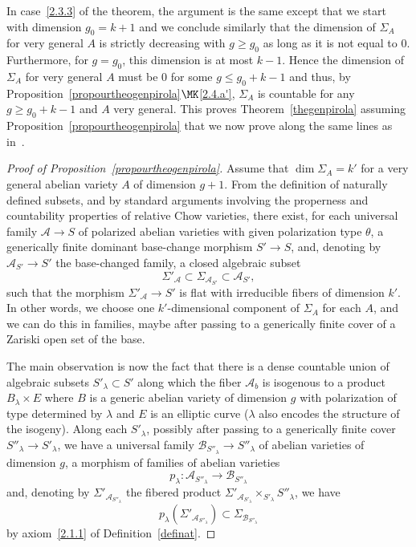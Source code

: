 In case~\eqref{2.3.3} of the theorem, the argument is the same except that we start with dimension $g_0=k+1$ and we conclude similarly that the dimension of $\Sigma_A$ for very general $A$ is strictly decreasing with $g\geq g_0$ as long as it is not equal to $0$. Furthermore, for $g=g_0$, this dimension is at most $k-1$. Hence the dimension of $\Sigma_A$ for very general $A$ must be $0$ for some $g\leq g_0+k-1$ and thus, by Proposition~\ref{propourtheogenpirola}$\MK$\eqref{2.4.a'}, $\Sigma_A$ is countable for any $g\geq g_0+k-1$ and $A$ very general. This proves Theorem~\ref{thegenpirola} assuming Proposition~\ref{propourtheogenpirola} that we now prove along the same lines as in~\cite{pirola}.

\begin{proof}[Proof of Proposition~\ref{propourtheogenpirola}]
Assume that $\dim \Sigma_A= k'$ for a very general abelian variety $A$ of dimension $g+1$. From the definition of naturally defined subsets, and by standard arguments involving the properness and countability properties of relative Chow varieties, there exist, for each universal family $\mathcal{A}\rightarrow S$ of polarized abelian varieties with given polarization type $\theta$, a generically finite dominant base-change morphism $S'\rightarrow S$, and, denoting by $\mathcal{A}_{S'}\rightarrow S'$ the base-changed family, a closed algebraic subset
\[
\Sigma'_{\mathcal{A}}\subset \Sigma_{\mathcal{A}_{S'}}\subset\mathcal{A}_{S'},
\]
such that the morphism $\Sigma'_{\mathcal{A}}\rightarrow S'$ is flat with irreducible fibers of dimension $k'$. In other words, we choose one $k'$-dimensional component of $\Sigma_A$ for each $A$, and we can do this in families, maybe after passing to a generically finite cover of a Zariski open set of the base.

The main observation is now the fact that there is a dense countable union of algebraic subsets $S'_\lambda\subset S'$ along which the fiber $\mathcal{A}_b$ is isogenous to a product $B_\lambda\times E$ where $B$ is a generic abelian variety of dimension $g$ with polarization of type determined by $\lambda$ and $E$ is an elliptic curve ($\lambda$ also encodes the structure of the isogeny). Along each $S'_\lambda$, possibly after passing to a generically finite cover $S''_\lambda\rightarrow S'_\lambda$, we have a universal family $\mathcal{B}_{S''_\lambda}\rightarrow S''_\lambda$ of abelian varieties of dimension $g$, a morphism of families of abelian varieties
\[
p_\lambda:\mathcal{A}_{S''_\lambda}\rightarrow \mathcal{B}_{S''_\lambda}
\]
and, denoting by $\Sigma'_{\mathcal{A}_{S''_\lambda}} $ the fibered product $\Sigma'_{\mathcal{A}_{S'_\lambda}} \times_{S'_\lambda}S''_\lambda$, we have
\[
p_\lambda(\Sigma'_{\mathcal{A}_{S''_\lambda}})\subset \Sigma_{\mathcal{B}_{S''_\lambda}}
\]
by axiom~\eqref{2.1.1} of Definition~\ref{definat}.


\end{proof}
